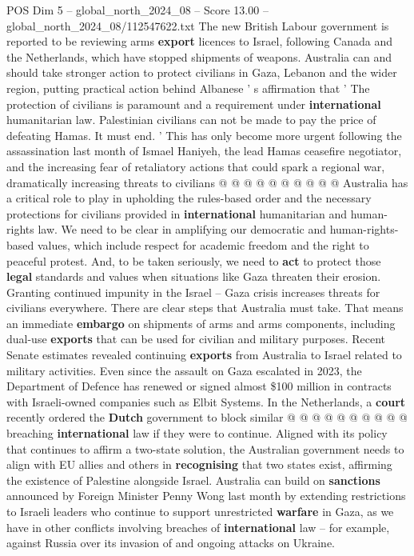\begin{textsample}{POS Dim 5 – global\_north\_2024\_08 – Score 13.00 – global\_north\_2024\_08/112547622.txt}
The new British Labour government is reported to be reviewing arms \textbf{export} licences to Israel, following Canada and the Netherlands, which have stopped shipments of weapons.
Australia can and should take stronger action to protect civilians in Gaza, Lebanon and the wider region, putting practical action behind Albanese ' s affirmation that ' The protection of civilians is paramount and a requirement under \textbf{international} humanitarian law.
Palestinian civilians can not be made to pay the price of defeating Hamas.
It must end. ' This has only become more urgent following the assassination last month of Ismael Haniyeh, the lead Hamas ceasefire negotiator, and the increasing fear of retaliatory actions that could spark a regional war, dramatically increasing threats to civilians @ @ @ @ @ @ @ @ @ @ Australia has a critical role to play in upholding the rules-based order and the necessary protections for civilians provided in \textbf{international} humanitarian and human-rights law.
We need to be clear in amplifying our democratic and human-rights-based values, which include respect for academic freedom and the right to peaceful protest.
And, to be taken seriously, we need to \textbf{act} to protect those \textbf{legal} standards and values when situations like Gaza threaten their erosion.
Granting continued impunity in the Israel -- Gaza crisis increases threats for civilians everywhere.
There are clear steps that Australia must take.
That means an immediate \textbf{embargo} on shipments of arms and arms components, including dual-use \textbf{exports} that can be used for civilian and military purposes.
Recent Senate estimates revealed continuing \textbf{exports} from Australia to Israel related to military activities.
Even since the assault on Gaza escalated in 2023, the Department of Defence has renewed or signed almost \$100 million in contracts with Israeli-owned companies such as Elbit Systems.
In the Netherlands, a \textbf{court} recently ordered the \textbf{Dutch} government to block similar @ @ @ @ @ @ @ @ @ @ breaching \textbf{international} law if they were to continue.
Aligned with its policy that continues to affirm a two-state solution, the Australian government needs to align with EU allies and others in \textbf{recognising} that two states exist, affirming the existence of Palestine alongside Israel.
Australia can build on \textbf{sanctions} announced by Foreign Minister Penny Wong last month by extending restrictions to Israeli leaders who continue to support unrestricted \textbf{warfare} in Gaza, as we have in other conflicts involving breaches of \textbf{international} law -- for example, against Russia over its invasion of and ongoing attacks on Ukraine.

\end{textsample}
